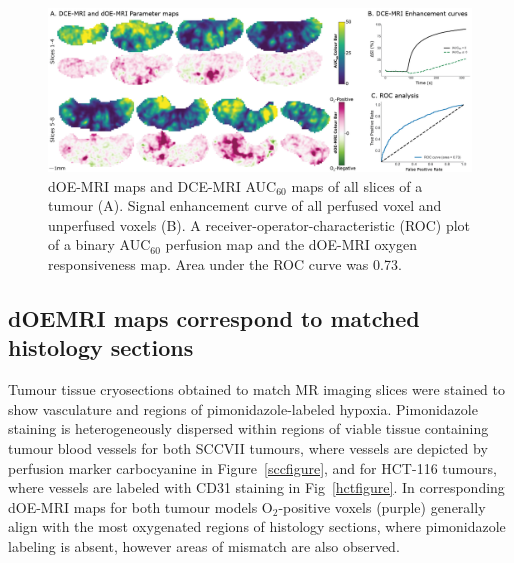 \begin{figure}[htbp]
   \centering
   \includegraphics[width=\textwidth]{oemri/oemri-images/oemri_perfusion.png} %
   \caption{dOE-MRI maps and DCE-MRI AUC$_{60}$ maps of all slices of a tumour (A).
Signal enhancement curve of all perfused voxel and unperfused voxels (B).
A receiver-operator-characteristic (ROC) plot of a binary AUC$_{60}$ perfusion map and the dOE-MRI oxygen responsiveness map.
Area under the ROC curve was 0.73.}
   \label{perfusion}
\end{figure}

\subsection{dOEMRI maps correspond to matched histology sections}

Tumour tissue cryosections obtained to match MR imaging slices were stained to show vasculature and regions of pimonidazole-labeled hypoxia.
Pimonidazole staining is heterogeneously dispersed within regions of viable tissue containing tumour blood vessels for both SCCVII tumours, where vessels are depicted by perfusion marker carbocyanine in Figure~\ref{sccfigure}, and for HCT-116 tumours, where vessels are labeled with CD31 staining in Fig~\ref{hctfigure}.
In corresponding dOE-MRI maps for both tumour models O$_2$-positive voxels (purple) generally align with the most oxygenated regions of histology sections, where pimonidazole labeling is absent, however areas of mismatch are also observed.


